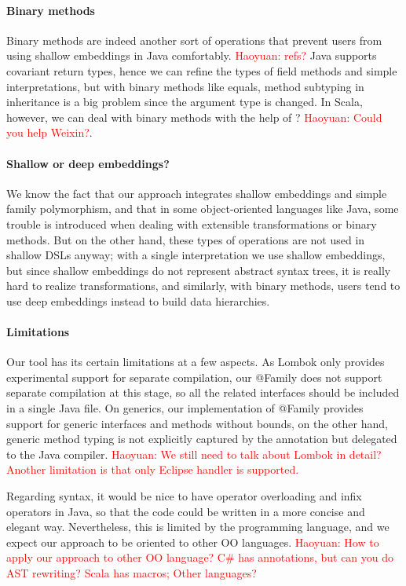 \paragraph{Binary methods} Binary methods are indeed another sort of operations that prevent users from using shallow embeddings in Java
comfortably. \textcolor{red}{Haoyuan: refs?} Java supports covariant return types, hence we can refine the types of field methods and 
simple interpretations, but with binary methods like \textsf{equals}, method subtyping in inheritance is a big problem since the argument type
is changed. In Scala, however, we can deal with binary methods with the help of ? \textcolor{red}{Haoyuan: Could you help Weixin?}.

\paragraph{Shallow or deep embeddings?} We know the fact that our approach integrates shallow embeddings and simple family polymorphism, and that in some object-oriented languages like Java,
some trouble is introduced when dealing with extensible transformations or binary methods. But on the other hand, these types of operations are not used in
shallow DSLs anyway; with a single interpretation we use shallow embeddings, but since shallow embeddings do not represent abstract syntax trees,
it is really hard to realize transformations, and similarly, with binary methods, users tend to use deep embeddings instead to build data hierarchies.

\paragraph{Limitations} Our tool has its certain limitations at a few aspects. As Lombok only provides experimental support
for separate compilation, our \textsf{@Family} does not support separate compilation at this stage, so all the related
interfaces should be included in a single Java file. On generics, our implementation of \textsf{@Family} provides support
for generic interfaces and methods without bounds, on the other hand, generic method typing is not explicitly captured
by the annotation but delegated to the Java compiler. \textcolor{red}{Haoyuan: We still need to talk about Lombok in detail?
Another limitation is that only Eclipse handler is supported.}

Regarding syntax, it would be nice to have operator overloading and infix operators in Java, so that the code could be
written in a more concise and elegant way. Nevertheless, this is limited by the programming language, and we expect our approach to be oriented to
other OO languages. \textcolor{red}{Haoyuan: How to apply our approach to other OO language? C\# has annotations, but can you do AST rewriting? Scala has macros;  Other languages?}
